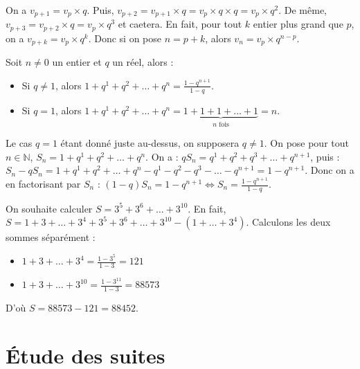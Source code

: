	\begin{demonstration}
		On a $v_{p+1} = v_p \times q$. Puis, $v_{p+2} = v_{p+1} \times q = v_p \times q \times q = v_p \times q^2$. De même, $v_{p+3} = v_{p+2} \times q = v_p \times q^3$  et caetera.
		\newline
		En fait, pour tout $k$ entier plus grand que $p$, on a $v_{p+k} = v_p \times q^k$.
		\newline
		Donc si on pose $n = p+k$, alors $v_n = v_p \times q^{n-p}$.
	\end{demonstration}

	\begin{formula}
		Soit $n \neq 0$ un entier et $q$ un réel, alors :
		\begin{itemize}
			\item Si $q \neq 1$, alors $1 + q^1 + q^2 + \dots + q^n = \frac{1 - q^{n + 1}}{1 - q}$.
			\item Si $q = 1$, alors $1 + q^1 + q^2 + \dots + q^n = \underbrace{1 + 1 + 1 + \dots + 1}_{n \text{ fois}} = n$.
		\end{itemize}
	\end{formula}

	\begin{demonstration}
		Le cas $q = 1$ étant donné juste au-dessus, on supposera $q \neq 1$. On pose pour tout $n \in \mathbb{N}$, $S_n = 1 + q^1 + q^2 + \dots + q^n$.
		\newpar
		On a : $qS_n = q^1 + q^2 + q^3 + \dots + q^{n+1}$, puis : $S_n - qS_n = 1 + q^1 + q^2 + \dots + q^n - q^1 - q^2 - q^3 - \dots - q^{n+1} = 1 - q^{n+1}$.
		\newpar
		Donc on a en factorisant par $S_n$ : $(1 - q)S_n = 1 - q^{n+1} \iff S_n = \frac{1 - q^{n+1}}{1 - q}$.
	\end{demonstration}

	\begin{tip}[Exemple]
		On souhaite calculer $S = 3^5 + 3^6 + \dots + 3^{10}$.
		\newpar
		En fait, $S = 1 + 3 + \dots + 3^4 + 3^5 + 3^6 + \dots + 3^{10} - (1 + \dots + 3^4)$. Calculons les deux sommes séparément :
		\begin{itemize}
			\item $1 + 3 + \dots + 3^4 = \frac{1 - 3^5}{1 - 3} = 121$
			\item $1 + 3 + \dots + 3^{10} = \frac{1 - 3^{11}}{1 - 3} = 88573$
		\end{itemize}
		D'où $S = 88573 - 121 = 88452$.
	\end{tip}

	\section{Étude des suites}

